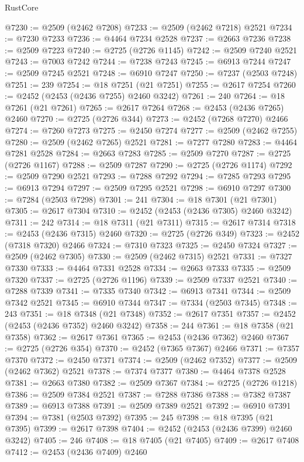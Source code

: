 \begin{lexlean}{RustCore}
\begin{coremodule}
@7230 := @2509 (@2462 @7208)
@7233 := @2509 (@2462 @7218) @2521
@7234 := @7230 @7233
@7236 := @4464 @7234 @2528
@7237 := @2663 @7236
@7238 := @2509 @7223
@7240 := @2725 (@2726 @1145)
@7242 := @2509 @7240 @2521
@7243 := @7003 @7242
@7244 := @7238 @7243
@7245 := @6913 @7244
@7247 := @2509 @7245 @2521
@7248 := @6910 @7247
@7250 := @7237 (@2503 @7248)
@7251 := 239
@7254 := @18 @7251 (@21 @7251)
@7255 := @2617 @7254
@7260 := @2452 (@2453 (@2436 @7255) @2460 @3242)
@7261 := 240
@7264 := @18 @7261 (@21 @7261)
@7265 := @2617 @7264
@7268 := @2453 (@2436 @7265) @2460
@7270 := @2725 (@2726 @344)
@7273 := @2452 (@7268 @7270) @2466
@7274 := @7260 @7273
@7275 := @2450 @7274
@7277 := @2509 (@2462 @7255)
@7280 := @2509 (@2462 @7265) @2521
@7281 := @7277 @7280
@7283 := @4464 @7281 @2528
@7284 := @2663 @7283
@7285 := @2509 @7270
@7287 := @2725 (@2726 @1167)
@7288 := @2509 @7287
@7290 := @2725 (@2726 @1174)
@7292 := @2509 @7290 @2521
@7293 := @7288 @7292
@7294 := @7285 @7293
@7295 := @6913 @7294
@7297 := @2509 @7295 @2521
@7298 := @6910 @7297
@7300 := @7284 (@2503 @7298)
@7301 := 241
@7304 := @18 @7301 (@21 @7301)
@7305 := @2617 @7304
@7310 := @2452 (@2453 (@2436 @7305) @2460 @3242)
@7311 := 242
@7314 := @18 @7311 (@21 @7311)
@7315 := @2617 @7314
@7318 := @2453 (@2436 @7315) @2460
@7320 := @2725 (@2726 @349)
@7323 := @2452 (@7318 @7320) @2466
@7324 := @7310 @7323
@7325 := @2450 @7324
@7327 := @2509 (@2462 @7305)
@7330 := @2509 (@2462 @7315) @2521
@7331 := @7327 @7330
@7333 := @4464 @7331 @2528
@7334 := @2663 @7333
@7335 := @2509 @7320
@7337 := @2725 (@2726 @1196)
@7339 := @2509 @7337 @2521
@7340 := @7288 @7339
@7341 := @7335 @7340
@7342 := @6913 @7341
@7344 := @2509 @7342 @2521
@7345 := @6910 @7344
@7347 := @7334 (@2503 @7345)
@7348 := 243
@7351 := @18 @7348 (@21 @7348)
@7352 := @2617 @7351
@7357 := @2452 (@2453 (@2436 @7352) @2460 @3242)
@7358 := 244
@7361 := @18 @7358 (@21 @7358)
@7362 := @2617 @7361
@7365 := @2453 (@2436 @7362) @2460
@7367 := @2725 (@2726 @354)
@7370 := @2452 (@7365 @7367) @2466
@7371 := @7357 @7370
@7372 := @2450 @7371
@7374 := @2509 (@2462 @7352)
@7377 := @2509 (@2462 @7362) @2521
@7378 := @7374 @7377
@7380 := @4464 @7378 @2528
@7381 := @2663 @7380
@7382 := @2509 @7367
@7384 := @2725 (@2726 @1218)
@7386 := @2509 @7384 @2521
@7387 := @7288 @7386
@7388 := @7382 @7387
@7389 := @6913 @7388
@7391 := @2509 @7389 @2521
@7392 := @6910 @7391
@7394 := @7381 (@2503 @7392)
@7395 := 245
@7398 := @18 @7395 (@21 @7395)
@7399 := @2617 @7398
@7404 := @2452 (@2453 (@2436 @7399) @2460 @3242)
@7405 := 246
@7408 := @18 @7405 (@21 @7405)
@7409 := @2617 @7408
@7412 := @2453 (@2436 @7409) @2460

\end{coremodule}
\end{lexlean}
